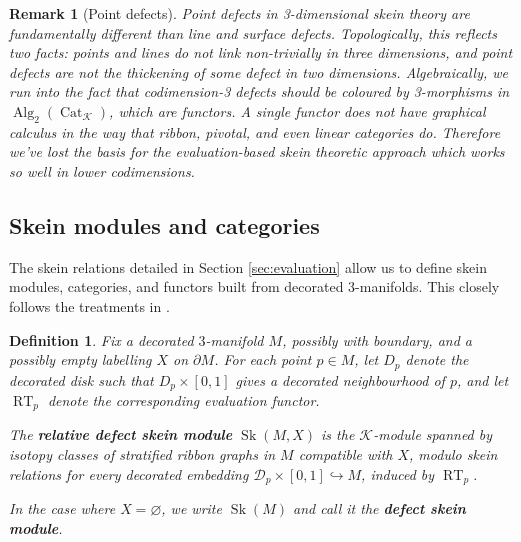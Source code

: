 \documentclass[a4paper]{article}
\numberwithin{equation}{section}
\newtheorem{definition}[counter]{Definition}
\newtheorem{remark}[counter]{Remark}
\newcommand{\1}{{\mathrm{1}\mkern-4mu{\mathchoice{}{}{\mskip-0.5mu}{\mskip-1mu}}\mathrm{l}}}
\newcommand{\D}{\mathcal{D}}
\newcommand{\K}{\mathcal{K}}
\DeclareMathOperator{\Cat}{Cat}
\DeclareMathOperator{\Sk}{Sk}
\DeclareMathOperator{\Alg}{Alg}
\DeclareMathOperator{\RT}{RT} %
\begin{document}
\begin{remark}[Point defects]\label{rem:point-defects}
  Point defects in 3-dimensional skein theory are fundamentally different than line and surface defects.
Topologically, this reflects two facts: points and lines do not link non-trivially in three dimensions, and point defects are not the thickening of some defect in two dimensions.
Algebraically, we run into the fact that codimension-3 defects should be coloured by 3-morphisms in $\Alg_2(\Cat_\K)$, which are functors.
A single functor does not have graphical calculus in the way that ribbon, pivotal, and even linear categories do.
Therefore we've lost the basis for the evaluation-based skein theoretic approach which works so well in lower codimensions.
\end{remark}

\subsection{Skein modules and categories}\label{sec:skein-modules-and-categories}
The skein relations detailed in Section \ref{sec:evaluation} allow us to define skein modules, categories, and functors built from decorated 3-manifolds.
This closely follows the treatments in \cite{GJS2023,Brown_Jordan_2025}.

\begin{definition}\label{def:relative-defect-skein-module}
Fix a decorated $3$-manifold $M$, possibly with boundary, and a possibly empty labelling $X$ on $\partial M$.
For each point $p \in M$, let $D_p$ denote the decorated disk such that $D_p\times [0,1]$ gives a decorated neighbourhood of $p$, and let $\RT_p$ denote the corresponding evaluation functor.

    The \emph{\bf relative defect skein module} $\Sk(M,X)$ is the $\K$-module spanned by isotopy classes of stratified ribbon graphs in $M$ compatible with $X$, modulo skein relations for every decorated embedding $\D_p \times [0,1] \hookrightarrow M$, induced by $\RT_p$.

    In the case where $X = \varnothing$, we write $\Sk(M)$ and call it the \textbf{defect skein module}.
\end{definition}
\end{document}
